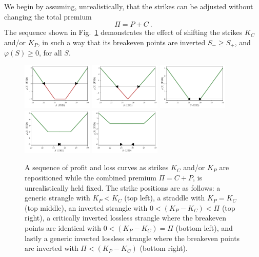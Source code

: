 \documentclass[aps,reprint]{revtex4-2}
\begin{document}
We begin by assuming, unrealistically, that the strikes can be adjusted without changing the total premium 
\begin{equation}
\Pi = P + C~.
\end{equation}
The sequence shown in Fig.~\ref{fig:sequence} demonstrates the effect of shifting the strikes $K_C$ and/or $K_P$,  in such a way that 
its breakeven points are inverted $S_- \geq S_+$, and  $\varphi(S) \geq 0$, for all $S$.
\begin{figure}[hb]
    \centering
    \includegraphics[width=0.3\textwidth]{figs/sequence1.pdf}
    \includegraphics[width=0.3\textwidth]{figs/sequence2.pdf}
    \includegraphics[width=0.3\textwidth]{figs/sequence3.pdf}
    \includegraphics[width=0.3\textwidth]{figs/sequence4.pdf}
    \includegraphics[width=0.3\textwidth]{figs/sequence5.pdf}
    \caption{A sequence of profit and loss curves as strikes $K_C$ and/or $K_P$ are repositioned while the combined premium $\Pi = C+P$, is unrealistically held fixed. The strike positions are as follows:
    a generic strangle with $K_P < K_C$ (top left), 
    a straddle with $K_P = K_C$ (top middle),   
    an inverted strangle with $0 < (K_P - K_C) < \Pi$ (top right), 
    a critically inverted lossless strangle where the breakeven points are identical with $0 < (K_P - K_C) = \Pi$ (bottom left),
    and lastly a generic inverted lossless strangle where the breakeven points are inverted with $\Pi < (K_P - K_C)$ (bottom right).}
    \label{fig:sequence}
\end{figure}
\end{document}
